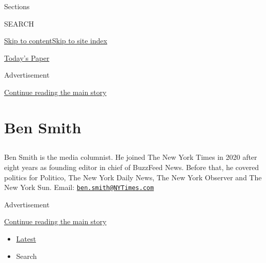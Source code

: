 Sections

SEARCH

\protect\hyperlink{site-content}{Skip to
content}\protect\hyperlink{site-index}{Skip to site index}

\href{https://myaccount.nytimes3xbfgragh.onion/auth/login?response_type=cookie\&client_id=vi}{}

\href{https://www.nytimes3xbfgragh.onion/section/todayspaper}{Today's
Paper}

Advertisement

\protect\hyperlink{after-top}{Continue reading the main story}

\hypertarget{ben-smith}{%
\section{Ben Smith}\label{ben-smith}}

\subsection{}

Ben Smith is the media columnist. He joined The New York Times in 2020
after eight years as founding editor in chief of BuzzFeed News. Before
that, he covered politics for Politico, The New York Daily News, The New
York Observer and The New York Sun. Email:
\href{mailto:ben.smith@NYTimes.com}{\nolinkurl{ben.smith@NYTimes.com}}

Advertisement

\protect\hyperlink{after-mid1}{Continue reading the main story}

\begin{itemize}
\tightlist
\item
  \protect\hyperlink{stream-panel}{Latest}
\item
  Search
\end{itemize}

